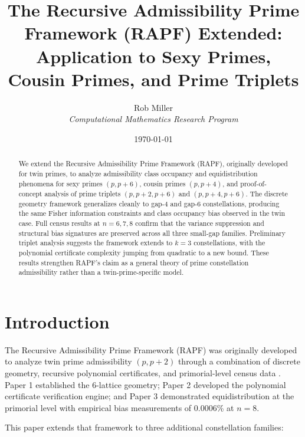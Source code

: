 \documentclass[10pt,a4paper]{article}
\title{\textbf{The Recursive Admissibility Prime Framework (RAPF) Extended:}\\
Application to Sexy Primes, Cousin Primes, and Prime Triplets}
\author{Rob Miller \\ 
\textit{Computational Mathematics Research Program}}
\date{\today}
\theoremstyle{remark}
\begin{document}
\maketitle

\begin{abstract}
\noindent
We extend the Recursive Admissibility Prime Framework (RAPF), originally developed for twin primes,
to analyze admissibility class occupancy and equidistribution phenomena for sexy primes $(p, p+6)$,
cousin primes $(p, p+4)$, and proof-of-concept analysis of prime triplets $(p, p+2, p+6)$ and
$(p, p+4, p+6)$. The discrete geometry framework generalizes cleanly to gap-4 and gap-6
constellations, producing the same Fisher information constraints and class occupancy bias
observed in the twin case. Full census results at $n = 6, 7, 8$ confirm that the variance
suppression and structural bias signatures are preserved across all three small-gap families.
Preliminary triplet analysis suggests the framework extends to $k = 3$ constellations,
with the polynomial certificate complexity jumping from quadratic to a new bound. These
results strengthen RAPF's claim as a general theory of prime constellation admissibility
rather than a twin-prime-specific model.\\[6pt]
\end{abstract}

\section{Introduction}

The Recursive Admissibility Prime Framework (RAPF) was originally developed to analyze
twin prime admissibility $(p, p+2)$ through a combination of discrete geometry, recursive
polynomial certificates, and primorial-level census data \cite{paper1,paper2,paper3}.
Paper 1 established the 6-lattice geometry; Paper 2 developed the polynomial certificate
verification engine; and Paper 3 demonstrated equidistribution at the primorial level with
empirical bias measurements of 0.0006\% at $n = 8$.

This paper extends that framework to three additional constellation families:
\end{document}
